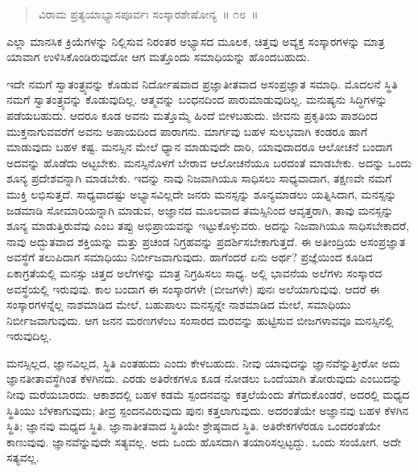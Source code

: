\vspace{-0.3cm}

\begin{verse}
ವಿರಾಮ ಪ್ರತ್ಯಯಾಭ್ಯಾಸಪೂರ್ವಃ ಸಂಸ್ಕಾರಶೇಷೋನ್ಯ~॥ ೧೮~॥
\end{verse}

\vspace{-0.3cm}

ಎಲ್ಲಾ ಮಾನಸಿಕ ಕ್ರಿಯೆಗಳನ್ನು ನಿಲ್ಲಿಸುವ ನಿರಂತರ ಅಭ್ಯಾಸದ ಮೂಲಕ, ಚಿತ್ತವು ಅವ್ಯಕ್ತ ಸಂಸ್ಕಾರಗಳನ್ನು ಮಾತ್ರ ಯಾವಾಗ ಉಳಿಸಿಕೊಂಡಿರುವುದೋ ಆಗ ಮತ್ತೊಂದು ಸಮಾಧಿಯನ್ನು ಹೊಂದಬಹುದು. 

ಇದೇ ನಮಗೆ ಸ್ವಾತಂತ್ರ್ಯವನ್ನು ಕೊಡುವ ನಿರ್ದೋಷವಾದ ಪ್ರಜ್ಞಾತೀತವಾದ ಅಸಂಪ್ರ\break ಜ್ಞಾತ ಸಮಾಧಿ. ಮೊದಲನೆ ಸ್ಥಿತಿ ನಮಗೆ ಸ್ವಾತಂತ್ರ್ಯವನ್ನು ಕೊಡುವುದಿಲ್ಲ. ಆತ್ಮವನ್ನು ಬಂಧನದಿಂದ ಪಾರುಮಾಡುವುದಿಲ್ಲ. ಮನುಷ್ಯನು ಸಿದ್ಧಿಗಳನ್ನು ಪಡೆಯಬಹುದು. ಆದರೂ ಕೂಡ ಅವನು ಮತ್ತೊಮ್ಮೆ ಹಿಂದೆ ಬೀಳಬಹುದು. ಜೀವನು ಪ್ರಕೃತಿಯ ಪಾಶದಿಂದ ಮುಕ್ತನಾಗುವವರೆಗೆ ಅವನು ಅಪಾಯದಿಂದ ಪಾರಾಗನು. ಮಾರ್ಗವು ಬಹಳ ಸುಲಭವಾಗಿ ಕಂಡರೂ ಹಾಗೆ ಮಾಡುವುದು ಬಹಳ ಕಷ್ಟ. ಮನಸ್ಸಿನ ಮೇಲೆ ಧ್ಯಾನ ಮಾಡುವುದೇ ದಾರಿ, ಯಾವುದಾದರೂ ಆಲೋಚನೆ ಬಂದಾಗ ಅದವನ್ನು ಹೊಡೆದು ಅಟ್ಟಬೇಕು. ಮನಸ್ಸಿ\break ನೊಳಗೆ ಬೇರಾವ ಆಲೋಚನೆಯೂ ಬರದಂತೆ ಮಾಡಬೇಕು. ಅದನ್ನು ಒಂದು ಶೂನ್ಯ ಪ್ರದೇಶವನ್ನಾಗಿ ಮಾಡಬೇಕು. ಇದನ್ನು ನಾವು ನಿಜವಾಗಿಯೂ ಸಾಧಿಸಲು ಸಾಧ್ಯವಾದಾಗ, ತಕ್ಷಣವೇ ನಮಗೆ ಮುಕ್ತಿ ಲಭಿಸುತ್ತದೆ. ಸಾಧ್ಯವಾದಷ್ಟು ಅಭ್ಯಾಸವಿಲ್ಲದೇ ಜನರು ಮನಸ್ಸನ್ನು ಶೂನ್ಯಮಾಡಲು ಯತ್ನಿಸಿದಾಗ, ಮನಸ್ಸನ್ನು ಜಡಮಾಡಿ ಸೋಮಾರಿಯನ್ನಾಗಿ ಮಾಡುವ, ಅಜ್ಞಾನದ ಮೂಲವಾದ ತಮಸ್ಸಿನಿಂದ ಆವೃತ್ತರಾಗಿ, ತಾವು ಮನಸ್ಸನ್ನು ಶೂನ್ಯ ಮಾಡುತ್ತಿರುವೆವು ಎಂಬ ತಪ್ಪು ಅಭಿಪ್ರಾಯವನ್ನು ಇಟ್ಟುಕೊಳ್ಳುವರು. ಅದನ್ನು ನಿಜವಾಗಿಯೂ ಸಾಧಿಸಬೇಕಾದರೆ, ನಾವು ಅದ್ಭುತವಾದ ಶಕ್ತಿಯನ್ನು ಮತ್ತು ಪ್ರಚಂಡ ನಿಗ್ರಹವನ್ನು ಪ್ರದರ್ಶಿಸಬೇಕಾಗುತ್ತದೆ. ಈ ಅತೀಂದ್ರಿಯ ಅಸಂಪ್ರಜ್ಞಾತ ಅವಸ್ಥೆಗೆ ತಲುಪಿದಾಗ ಸಮಾಧಿಯು ನಿರ್ಬೀಜವಾಗುವುದು. ಹಾಗೆಂದರೆ ಏನು ಅರ್ಥ? ಪ್ರಜ್ಞೆಯಿಂದ ಕೂಡಿದ ಏಕಾಗ್ರತೆಯಲ್ಲಿ ಮನಸ್ಸು ಚಿತ್ತದ ಅಲೆಗಳನ್ನು ಮಾತ್ರ ನಿಗ್ರಹಿಸಲು ಸಾಧ್ಯ. ಅಲ್ಲಿ ಭಾವನೆಯ ಅಲೆಗಳು ಸಂಸ್ಕಾರದ ಅವಸ್ಥೆಯಲ್ಲಿ ಇರುವುವು. ಕಾಲ ಬಂದಾಗ ಈ ಸಂಸ್ಕಾರಗಳೇ (ಬೀಜಗಳೇ) ಪುನಃ ಅಲೆಯಾಗುವುವು. ಆದರೆ ಈ ಸಂಸ್ಕಾರಗಳನ್ನೆಲ್ಲ ನಾಶಮಾಡಿದ ಮೇಲೆ, ಬಹುಪಾಲು ಮನಸ್ಸನ್ನೇ ನಾಶಮಾಡಿದ ಮೇಲೆ, ಸಮಾಧಿಯು ನಿರ್ಬೀಜವಾಗುವುದು. ಆಗ ಜನನ ಮರಣಗಳೆಂಬ ಸಂಸಾರದ ಮರವನ್ನು ಹುಟ್ಟಿಸುವ ಬೀಜಗಳಾವವೂ ಮನಸ್ಸಿನಲ್ಲಿ ಇರುವುದಿಲ್ಲ. 

ಮನಸ್ಸಿಲ್ಲದ, ಜ್ಞಾನವಿಲ್ಲದ, ಸ್ಥಿತಿ ಎಂತಹುದು ಎಂದು ಕೇಳಬಹುದು. ನೀವು ಯಾವುದನ್ನು ಜ್ಞಾನವೆನ್ನುತ್ತೀರೋ ಅದು ಜ್ಞಾನತೀತಾವಸ್ಥೆಗಿಂತ ಕೆಳಗಿನದು. ಎರಡು ಅತಿರೇಕಗಳೂ ಕೂಡ ನೋಡಲು ಒಂದೆಯಾಗಿ ತೋರುವುದು ಎಂಬುದನ್ನು ನೀವು ಮರೆಯಬಾರದು. ಆಕಾಶದಲ್ಲಿ ಬಹಳ ಕಡಮೆ ಸ್ಪಂದನವನ್ನು ಕತ್ತಲೆಯೆಂದು ತೆಗೆದುಕೊಂಡರೆ, ಅದರಲ್ಲಿ ಮಧ್ಯದ ಸ್ಥಿತಿಯು ಬೆಳಕಾಗುವುದು; ತೀವ್ರ ಸ್ಪಂದನವಿರುವುದು ಪುನಃ ಕತ್ತಲಾಗುವುದು. ಅದರಂತೆಯೇ ಅಜ್ಞಾನವು ಬಹಳ ಕೆಳಗಿನ ಸ್ಥಿತಿ; ಜ್ಞಾನವು ಮಧ್ಯದ ಸ್ಥಿತಿ. ಜ್ಞಾನಾತೀತವಾದ ಸ್ಥಿತಿಯೇ ಶ್ರೇಷ್ಠವಾದ ಸ್ಥಿತಿ. ಅತಿರೇಕಗಳೆರಡೂ ಒಂದರಂತೆಯೇ ಕಾಣುವುವು. ಜ್ಞಾನವೆನ್ನುವುದೇ ಸತ್ಯವಲ್ಲ. ಅದು ಒಂದು ಹೊಸದಾಗಿ ತಯಾರಿಸಲ್ಪಟ್ಟದ್ದು. ಒಂದು ಸಂಯೋಗ. ಅದೇ ಸತ್ಯವಲ್ಲ. 

